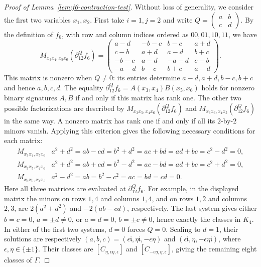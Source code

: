 \begin{proof}[Proof of Lemma~\ref{lem:f6-contraction-test}]
Without loss of generality, we consider the first two variables $x_1,x_2$.
First take $i=1,j=2$ and write
$Q=\left(\begin{smallmatrix}a&b\\c&d\end{smallmatrix}\right)$.
By the definition of $f_6$, with row and column indices ordered
as $00,01,10,11$, we have
\[
M_{x_3x_4,x_5x_6}(\partial_{12}^Qf_6)=
\begin{pmatrix}
a-d&-b-c&b-c&a+d\\
c-b&a+d&a-d&b+c\\
-b-c&a-d&-a-d&c-b\\
-a-d&b-c&b+c&a-d
\end{pmatrix}.
\]
This matrix is nonzero when $Q\ne0$: its entries determine
$a-d,a+d,b-c,b+c$ and hence $a,b,c,d$.
The equality $\partial_{12}^Qf_6=A(x_3,x_4)B(x_5,x_6)$ holds
for nonzero binary signatures $A,B$ if and only if this matrix
has rank one. The other two possible factorizations are described
by $M_{x_3x_5,x_4x_6}(\partial_{12}^Qf_6)$ and
$M_{x_3x_6,x_4x_5}(\partial_{12}^Qf_6)$ in the same way.
A nonzero matrix has rank one if and only if all its
$2$-by-$2$ minors vanish. Applying this criterion gives the following
necessary conditions for each matrix:
\[
\begin{array}{c|l}
M_{x_3x_4,x_5x_6}&a^2+d^2=ab-cd=b^2+d^2=ac+bd=ad+bc=c^2-d^2=0,\\
M_{x_3x_5,x_4x_6}&a^2+d^2=ab+cd=b^2-d^2=ac-bd=ad+bc=c^2+d^2=0,\\
M_{x_3x_6,x_4x_5}&a^2-d^2=ab=b^2-c^2=ac=bd=cd=0.
\end{array}
\]
Here all three matrices are evaluated at $\partial_{12}^Qf_6$.
For example, in the displayed matrix the minors on rows $1,4$
and columns $1,4$, and on rows $1,2$ and columns $2,3$, are
$2(a^2+d^2)$ and $-2(ab-cd)$, respectively.
The last system gives either $b=c=0$, $a=\pm d\ne0$, or
$a=d=0$, $b=\pm c\ne0$, hence exactly the classes in $K_4$.
In either of the first two systems, $d=0$ forces $Q=0$.
Scaling to $d=1$, their solutions are respectively
$(a,b,c)=(\epsilon\mathfrak i,\eta\mathfrak i,-\epsilon\eta)$ and
$(\epsilon\mathfrak i,\eta,-\epsilon\eta\mathfrak i)$, where
$\epsilon,\eta\in\{\pm1\}$.
Their classes are $[C_{\eta,\epsilon\eta,\epsilon}]$ and
$[C_{-\epsilon\eta,\eta,\epsilon}]$, giving the remaining eight
classes of $\Gamma$.


\end{proof}
